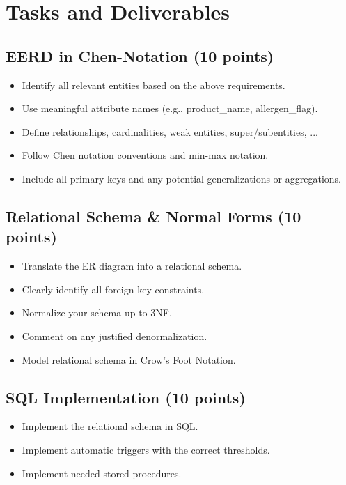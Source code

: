 \section{Tasks and Deliverables}

\subsection{EERD in Chen-Notation (10 points)}

\begin{itemize}[label=--]
    \item Identify all relevant entities based on the above requirements.
    \item Use meaningful attribute names (e.g., product\_name, allergen\_flag).
    \item Define relationships, cardinalities, weak entities, super/subentities, ...
    \item Follow Chen notation conventions and min-max notation.
    \item Include all primary keys and any potential generalizations or aggregations.
\end{itemize}

\subsection{Relational Schema \& Normal Forms (10 points)}

\begin{itemize}[label=--]
    \item Translate the ER diagram into a relational schema.
    \item Clearly identify all foreign key constraints.
    \item Normalize your schema up to 3NF.
    \item Comment on any justified denormalization.
    \item Model relational schema in Crow’s Foot Notation.
\end{itemize}

\subsection{SQL Implementation (10 points)}

\begin{itemize}[label=--]
    \item Implement the relational schema in SQL.
    \item Implement automatic triggers with the correct thresholds.
    \item Implement needed stored procedures.
\end{itemize}